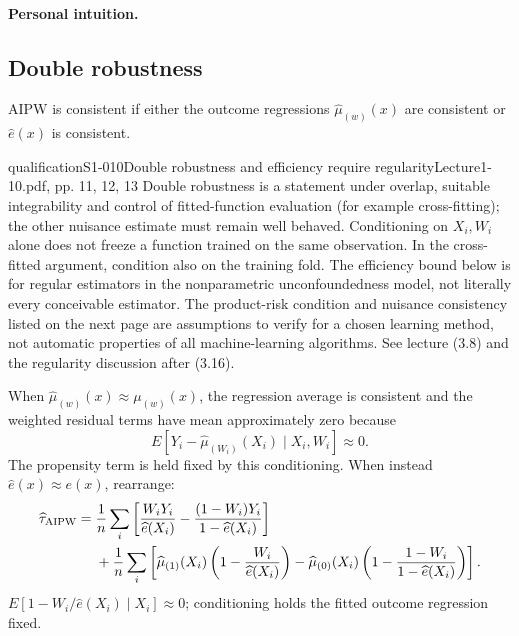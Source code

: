 \paragraph{Personal intuition.}
\subsection{Double robustness}
AIPW is consistent if either the outcome regressions $\widehat\mu_{(w)}(x)$ are consistent or $\widehat e(x)$ is consistent.
\begin{reviewnote}{qualification}{S1-010}{Double robustness and efficiency require regularity}{Lecture1-10.pdf, pp. 11, 12, 13}
Double robustness is a statement under overlap, suitable integrability and control of fitted-function evaluation (for example cross-fitting); the other nuisance estimate must remain well behaved. Conditioning on $X_i,W_i$ alone does not freeze a function trained on the same observation. In the cross-fitted argument, condition also on the training fold. The efficiency bound below is for regular estimators in the nonparametric unconfoundedness model, not literally every conceivable estimator. The product-risk condition and nuisance consistency listed on the next page are assumptions to verify for a chosen learning method, not automatic properties of all machine-learning algorithms. See lecture (3.8) and the regularity discussion after (3.16).
\end{reviewnote}

When $\widehat\mu_{(w)}(x)\approx\mu_{(w)}(x)$, the regression average is consistent and the weighted residual terms have mean approximately zero because
\[
E[Y_i-\widehat\mu_{(W_i)}(X_i)\mid X_i,W_i]\approx0.
\]
The propensity term is held fixed by this conditioning. When instead $\widehat e(x)\approx e(x)$, rearrange:
\begin{align*}
\widehat\tau_{\rm AIPW}={}&\frac1n\sum_i\left[\frac{W_iY_i}{\widehat e(X_i)}
-\frac{(1-W_i)Y_i}{1-\widehat e(X_i)}\right]\\
&+\frac1n\sum_i\left[\widehat\mu_{(1)}(X_i)\left(1-\frac{W_i}{\widehat e(X_i)}\right)
-\widehat\mu_{(0)}(X_i)\left(1-\frac{1-W_i}{1-\widehat e(X_i)}\right)\right].
\end{align*}
 
$E[1-W_i/\widehat e(X_i)\mid X_i]\approx0$; conditioning holds the fitted outcome regression fixed.
